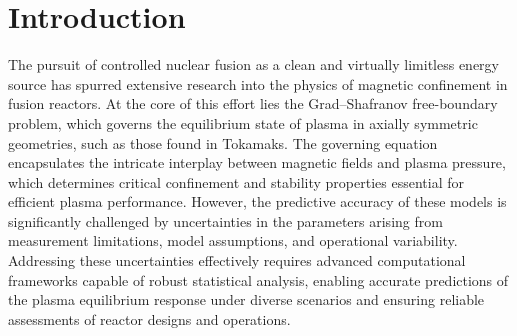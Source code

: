 \section{Introduction}\label{sec:intro}
The pursuit of controlled nuclear fusion as a clean and virtually limitless energy source has spurred extensive research into the physics of magnetic confinement in fusion reactors. At the core of this effort lies the Grad–Shafranov free-boundary problem, which governs the equilibrium state of plasma in axially symmetric geometries, such as those found in Tokamaks. The governing equation encapsulates the intricate interplay between magnetic fields and plasma pressure, which determines critical confinement and stability properties essential for efficient plasma performance. However, the predictive accuracy of these models is significantly challenged by uncertainties in the parameters arising from measurement limitations, model assumptions, and operational variability. Addressing these uncertainties effectively requires advanced computational frameworks capable of robust statistical analysis, enabling accurate predictions of the plasma equilibrium response under diverse scenarios and ensuring reliable assessments of reactor designs and operations.

